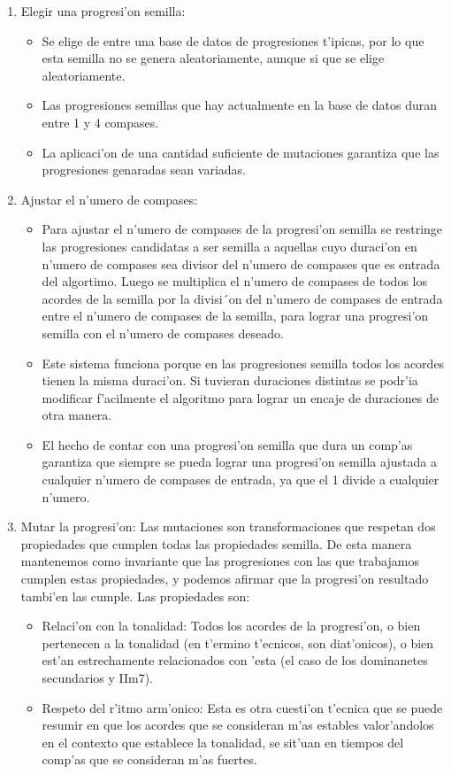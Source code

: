 \documentclass[a4paper,12pt]{article}
\begin{document}
\begin{enumerate}
\item Elegir una progresi'on semilla: 
        \begin{itemize}
        \item Se elige de entre una base de datos de progresiones t'ipicas, por lo que esta semilla no se genera aleatoriamente, aunque si que se elige aleatoriamente.
        \item Las progresiones semillas que hay actualmente en la base de datos duran entre 1 y 4 compases.
        \item La aplicaci'on de una cantidad suficiente de mutaciones garantiza que las progresiones genaradas sean variadas.
        \end{itemize}       
\item Ajustar el n'umero de compases:
        \begin{itemize}
        \item Para ajustar el n'umero de compases de la progresi'on semilla se restringe las progresiones candidatas a ser semilla a aquellas cuyo duraci'on en n'umero de compases sea divisor del n'umero de compases que es entrada del algortimo. Luego se multiplica el n'umero de compases de todos los acordes de la semilla por la divisi´on del n'umero de compases de entrada entre el n'umero de compases de la semilla, para lograr una progresi'on semilla con el n'umero de compases deseado.
        \item Este sistema funciona porque en las progresiones semilla todos los acordes tienen la misma duraci'on. Si tuvieran duraciones distintas se podr'ia modificar f'acilmente el algoritmo para lograr un encaje de duraciones de otra manera.
        \item El hecho de contar con una progresi'on semilla que dura un comp'as garantiza que siempre se pueda lograr una progresi'on semilla ajustada a cualquier n'umero de compases de entrada, ya que el 1 divide a cualquier n'umero.
        \end{itemize}       
\item Mutar la progresi'on: Las mutaciones son transformaciones que respetan dos propiedades que cumplen todas las propiedades semilla. De esta manera mantenemos como invariante que las progresiones con las que trabajamos cumplen estas propiedades, y podemos afirmar que la progresi'on resultado tambi'en las cumple. Las propiedades son:

        \begin{itemize}
        \item Relaci'on con la tonalidad: Todos los acordes de la progresi'on, o bien pertenecen a la tonalidad (en t'ermino t'ecnicos, son diat'onicos), o bien est'an estrechamente relacionados con 'esta (el caso de los dominanetes secundarios y IIm7). 
        \item Respeto del r'itmo arm'onico: Esta es otra cuesti'on t'ecnica que se puede resumir en que los acordes que se consideran m'as estables valor'andolos en el contexto que establece la tonalidad, se sit'uan en tiempos del comp'as que se consideran m'as fuertes.
        \end{itemize}


\end{enumerate}
\end{document}

